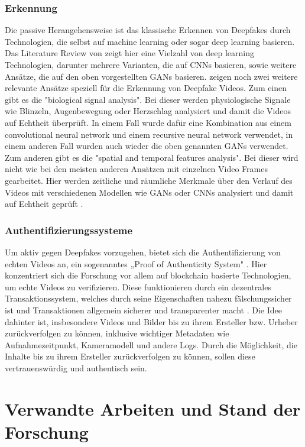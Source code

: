 \subsubsection{Erkennung}
Die passive Herangehensweise ist das klassische Erkennen von Deepfakes durch Technologien, die selbst auf machine learning oder sogar deep learning basieren. 
Das Literature Review von \textcite{abbasUnmaskingDeepfakesSystematic2024} zeigt hier eine Vielzahl von deep learning Technologien, 
darunter mehrere Varianten, die auf CNNs basieren, sowie weitere Ansätze, die auf den oben vorgestellten GANs basieren. 
\textcite{benaissaOverviewGANDeepFakesDetection2024} zeigen noch zwei weitere relevante Ansätze speziell für die Erkennung von Deepfake Videos. 
Zum einen gibt es die "biological signal analysis". Bei dieser werden physiologische Signale wie Blinzeln, Augenbewegung oder Herzschlag analysiert und damit die Videos auf Echtheit überprüft. 
In einem Fall wurde dafür eine Kombination aus einem convolutional neural network und einem recursive neural network verwendet, 
in einem anderen Fall wurden auch wieder die oben genannten GANs verwendet.
Zum anderen gibt es die "spatial and temporal features analysis". Bei dieser wird nicht wie bei den meisten anderen Ansätzen mit einzelnen Video Frames gearbeitet. 
Hier werden zeitliche und räumliche Merkmale über den Verlauf des Videos mit verschiedenen Modellen wie GANs oder CNNs analysiert und damit auf Echtheit geprüft \cite{benaissaOverviewGANDeepFakesDetection2024}.
\subsubsection{Authentifizierungssysteme}
Um aktiv gegen Deepfakes vorzugehen, bietet sich die Authentifizierung von echten Videos an, 
ein sogenanntes „Proof of Authenticity System" \cite{gambinDeepfakesCurrentFuture2024}. 
Hier konzentriert sich die Forschung vor allem auf blockchain basierte Technologien, um echte Videos zu verifizieren. 
Diese funktionieren durch ein dezentrales Transaktionssystem, 
welches durch seine Eigenschaften nahezu fälschungssicher ist und Transaktionen allgemein sicherer und transparenter macht \cite{gambinDeepfakesCurrentFuture2024}. 
Die Idee dahinter ist, insbesondere Videos und Bilder bis zu ihrem Ersteller bzw. Urheber zurückverfolgen zu können, 
inklusive wichtiger Metadaten wie Aufnahmezeitpunkt, Kameramodell und andere Logs. 
Durch die Möglichkeit, die Inhalte bis zu ihrem Ersteller zurückverfolgen zu können, sollen diese vertrauenswürdig und authentisch sein.
\section{Verwandte Arbeiten und Stand der Forschung}
